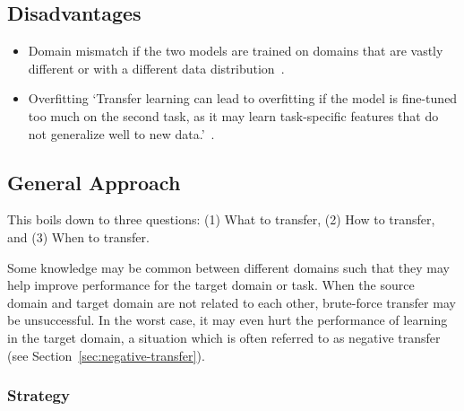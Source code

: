 \documentclass[11pt]{article}
\begin{document}
\subsection{Disadvantages}

\begin{itemize}
    \item Domain mismatch if the two models are trained on domains that are vastly different or with a different data distribution~\cite{geeks-transfer-learning}.
    \item Overfitting `Transfer learning can lead to overfitting if the model is fine-tuned too much on the second task, as it may learn task-specific features that do not generalize well to new data.'~\cite{geeks-transfer-learning}.
\end{itemize}

\subsection{General Approach}

This boils down to three questions: (1) What to transfer, (2) How to transfer, and (3) When to transfer.

Some knowledge may be common between different domains such that they may help improve performance for the target domain or task. When the source domain and target domain are not related to each other, brute-force transfer may be unsuccessful. In the worst case, it may even hurt the performance of learning in the target domain, a situation which is often referred to as negative transfer (see Section~\ref{sec:negative-transfer}).

\subsubsection{Strategy}
\end{document}
